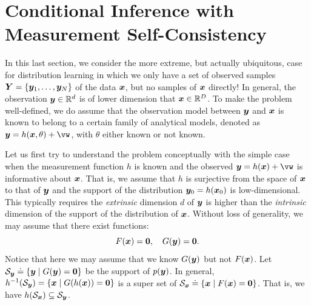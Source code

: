 \documentclass[../../book-main.tex]{subfiles}
\begin{document}



\section{Conditional Inference with Measurement Self-Consistency}
\label{sec:measurement-self-consistency}
In this last section, we consider the more extreme, but actually ubiquitous, case for distribution learning in which we only have a set of observed samples $\bm{Y} = \{\bm{y}_1,\ldots, \bm{y}_N\}$ of the data $\bm{x}$, but no samples of $\bm{x}$ directly! In general, the observation $\bm{y} \in \mathbb{R}^d$ is of lower dimension that $\bm{x} \in \mathbb{R}^D$. To make the problem well-defined, we do assume that the observation model between $\bm{y}$ and $\bm{x}$ is known to belong to a certain family of analytical models, denoted as $\y = h(\x, \theta) +\vw$, with $\theta$ either known or not known. 

Let us first try to understand the problem conceptually with the simple case when the measurement function $h$ is known and the observed $\y = h(\x) + \vw$ is informative about $\bm{x}$. That is, we assume that $h$ is surjective from the space of $\bm{x}$ to that of $\bm{y}$ and the support of the distribution $\bm{y}_0 = h(\bm{x}_0)$ is low-dimensional. This typically requires the \textit{extrinsic} dimension $d$ of $\bm{y}$ is higher than the \textit{intrinsic} dimension of the support of the distribution of $\bm{x}$. Without loss of generality, we may assume that there exist functions:
\begin{equation}
F(\bm{x}) = \boldsymbol{0},\quad     G(\bm{y}) = \boldsymbol{0}.
\end{equation}
Notice that here we may assume that we know $G(\bm{y})$ but not $F(\bm{x})$. Let $\mathcal{S}_{\bm{y}} \doteq \{\bm{y} \mid G(\bm{y}) = \boldsymbol{0}\}$ be the support of $p(\bm{y})$.  In general, $h^{-1}(\mathcal{S}_{\bm{y}}) = \{\bm{x} \mid G(h(\bm{x})) = \boldsymbol{0}\}$ is a super set of $\mathcal{S}_{\bm{x}} \doteq \{\bm{x} \mid F(\bm{x}) = \boldsymbol{0}\}$. That is, we have $h(\mathcal{S}_{\bm{x}}) \subseteq \mathcal{S}_{\bm{y}}$.
\end{document}
